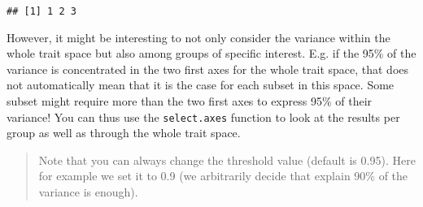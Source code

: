 \documentclass[
]{book}
\newenvironment{Shaded}{\begin{snugshade}}{\end{snugshade}}
\newcommand{\CommentTok}[1]{\textcolor[rgb]{0.56,0.35,0.01}{\textit{#1}}}
\newcommand{\NormalTok}[1]{#1}
\newcommand{\OperatorTok}[1]{\textcolor[rgb]{0.81,0.36,0.00}{\textbf{#1}}}
\begin{document}
\begin{Shaded}
\end{Shaded}

\begin{verbatim}
## [1] 1 2 3
\end{verbatim}

However, it might be interesting to not only consider the variance within the whole trait space but also among groups of specific interest.
E.g. if the 95\% of the variance is concentrated in the two first axes for the whole trait space, that does not automatically mean that it is the case for each subset in this space. Some subset might require more than the two first axes to express 95\% of their variance!
You can thus use the \texttt{select.axes} function to look at the results per group as well as through the whole trait space.

\begin{quote}
Note that you can always change the threshold value (default is 0.95). Here for example we set it to 0.9 (we arbitrarily decide that explain 90\% of the variance is enough).
\end{quote}
\end{document}
